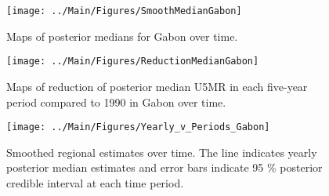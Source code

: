\documentclass[12pt]{article}\usepackage[]{graphicx}\usepackage[]{color}
\newenvironment{knitrout}{}{} %
\begin{document}
\begin{knitrout}
\color{fgcolor}\begin{figure}[bht]

{\centering \texttt{[image: ../Main/Figures/SmoothMedianGabon]} 

}

\caption[Maps of posterior medians for Gabon  over time]{Maps of posterior medians for Gabon  over time.}\label{fig:unnamed-chunk-124}
\end{figure}


\end{knitrout}
\begin{knitrout}
\color{fgcolor}\begin{figure}[bht]

{\centering \texttt{[image: ../Main/Figures/ReductionMedianGabon]} 

}

\caption[Maps of reduction of posterior median U5MR in each five-year period compared to 1990 in Gabon over time]{Maps of reduction of posterior median U5MR in each five-year period compared to 1990 in Gabon over time.}\label{fig:unnamed-chunk-125}
\end{figure}


\end{knitrout}
\begin{knitrout}
\color{fgcolor}\begin{figure}[bht]

{\centering \texttt{[image: ../Main/Figures/Yearly\_v\_Periods\_Gabon]} 

}

\caption[Smoothed regional estimates over time]{Smoothed regional estimates over time. The line indicates yearly posterior median estimates and error bars indicate 95 \% posterior credible interval at each time period.}\label{fig:unnamed-chunk-126}
\end{figure}


\end{knitrout}
\end{document}
